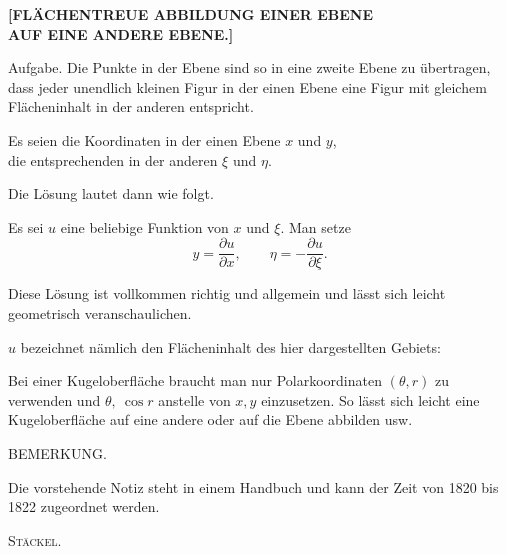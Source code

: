 \clearpage
{}%
\begin{center}\large\bfseries [FLÄCHENTREUE ABBILDUNG EINER EBENE\\ AUF EINE ANDERE EBENE.]\end{center}

Aufgabe. Die Punkte in der Ebene sind so in eine zweite Ebene zu übertragen, dass jeder unendlich kleinen Figur in der einen Ebene eine Figur mit gleichem Flächeninhalt in der anderen entspricht.

Es seien die Koordinaten in der einen Ebene $x$ und $y$,\\
\hspace*{1.6em}die entsprechenden in der anderen $\xi$ und $\eta$.

\noindent Die  Lösung lautet dann wie folgt.

Es sei $u$ eine beliebige Funktion von $x$ und $\xi$. Man setze
\[
y=\frac{\partial u}{\partial x},\qquad \eta=-\frac{\partial u}{\partial\xi}.
\]

\indent Diese Lösung ist vollkommen richtig und allgemein und lässt sich leicht geometrisch veranschaulichen.

$u$ bezeichnet nämlich den Flächeninhalt des hier dargestellten Gebiets:
\begin{center}\end{center}

Bei einer Kugeloberfläche braucht man nur Polarkoordinaten $(\theta,r)$ zu verwenden und $\theta,\ \cos r$ anstelle von $x,y$ einzusetzen. So lässt sich leicht eine Kugeloberfläche auf eine andere oder auf die Ebene abbilden usw.

\begin{center}BEMERKUNG.\end{center}

Die vorstehende Notiz steht in einem Handbuch und kann der Zeit von 1820 bis 1822 zugeordnet werden.
\begin{flushright}\textsc{Stäckel}.\end{flushright}
